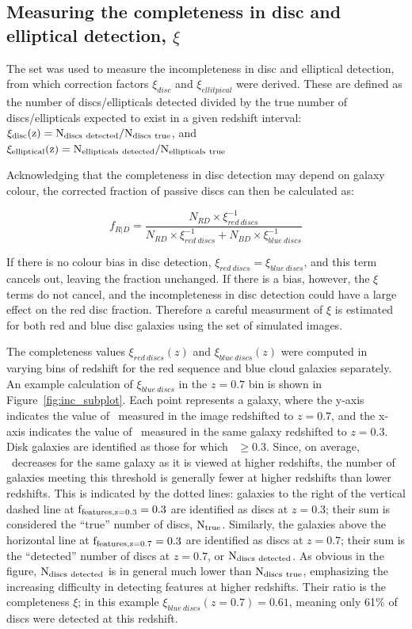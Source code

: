 \documentclass[useAMS,usenatbib]{mn2e}
\begin{document}
\subsection{Measuring the completeness in disc and elliptical detection, $\xi$}
\label{ssec:xi}

The  set was used to measure the incompleteness in disc and elliptical detection, from which correction factors $\xi_{disc}$ and $\xi_{ellitpical}$ were derived. These are defined as the number of discs/ellipticals detected divided by the true number of discs/ellipticals expected to exist in a given redshift interval: $\rm \xi_{disc}(z)=N_{discs~detected}/N_{\rm discs~true}$, and $\rm \xi_{elliptical}(z)=N_{ellipticals~detected}/N_{ellipticals~true}$


 Acknowledging that the completeness in disc detection may depend on galaxy colour, the corrected fraction of passive discs can then be calculated as:

\begin{equation}
f_{R|D}=\frac{N_{RD}\times \xi^{-1}_{red~discs}}{N_{RD}\times \xi^{-1}_{red~discs} + N_{BD} \times \xi^{-1}_{blue~discs}}
\label{eqn:fdir}
\end{equation}

If there is no colour bias in disc detection, $\xi_{red~discs}=\xi_{blue~discs}$, and this term cancels out, leaving the fraction unchanged. If there is a bias, however, the $\xi$ terms do not cancel, and the incompleteness in disc detection could have a large effect on the red disc fraction. Therefore a careful measurment of $\xi$ is estimated for both red and blue disc galaxies using the  set of simulated images. 

The completeness values $\xi_{red~discs}(z)$ and $\xi_{blue~discs}(z)$ were computed in varying bins of redshift for the red sequence and blue cloud galaxies separately. An example calculation of $\xi_{blue~discs}$ in the $z=0.7$ bin is shown in Figure~\ref{fig:inc_subplot}. Each point represents a  galaxy, where the y-axis indicates the value of \ffeatures~measured in the image redshifted to $z=0.7$, and the x-axis indicates the value of \ffeatures~measured in the same galaxy redshifted to $z=0.3$. Disk galaxies are identified as those for which \ffeatures~$\ge0.3$. Since, on average, \ffeatures~decreases for the same galaxy as it is viewed at higher redshifts, the number of galaxies meeting this threshold is generally fewer at higher redshifts than lower redshifts. This is indicated by the dotted lines: galaxies to the right of the vertical dashed line at $\rm f_{features,z=0.3}=0.3$ are identified as discs at $z=0.3$; their sum is considered the ``true'' number of discs, $\rm N_{true}$. Similarly, the galaxies above the horizontal line at $\rm f_{features,z=0.7}=0.3$ are identified as discs at $z=0.7$; their sum is the ``detected'' number of discs at $z=0.7$, or $\rm N_{discs~detected}$. As obvious in the figure, $\rm N_{discs~detected}$ is in general much lower than $\rm N_{discs~true}$, emphasizing the increasing difficulty in detecting features at higher redshifts. Their ratio is the completeness $\xi$; in this example $\xi_{blue~discs}(z=0.7)=0.61$, meaning only 61\% of discs were detected at this redshift. 
\end{document}
